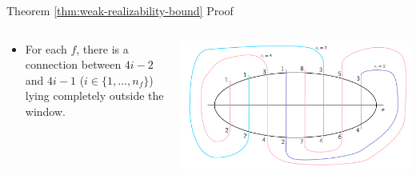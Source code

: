 \documentclass[10pt,aspectratio=169]{beamer}
\theoremstyle{plain}
\newcommand{\set}[1]{\{#1\}}
\begin{document}
\begin{frame}{Theorem \ref{thm:weak-realizability-bound} Proof}
    \begin{columns}
    \begin{column}{0.35\textwidth}
        \begin{itemize}
            \item For each \(f\), there is a connection between \(4i-2\) and \(4i-1\) (\(i \in \set{1,\ldots, n_f}\)) lying completely outside the window.
        \end{itemize}
    \end{column}
    \begin{column}{0.65\textwidth}
        \begin{center}
            \includegraphics[width=\textwidth]{images/figure-6.pdf}
        \end{center}
    \end{column}
    \end{columns}
\end{frame}
\end{document}

